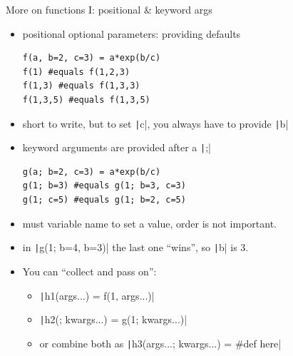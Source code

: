 \documentclass[aspectratio=169, 12pt]{beamer}
\begin{document}
    \begin{frame}[fragile]{More on functions I: positional \& keyword args}
        \begin{itemize}
            \item \alert{positional optional} parameters: providing defaults
        \begin{verbatim}
f(a, b=2, c=3) = a*exp(b/c)
f(1) #equals f(1,2,3)
f(1,3) #equals f(1,3,3)
f(1,3,5) #equals f(1,3,5)
        \end{verbatim}
        \item short to write, \alert{but} to set \texttt|c|, you always have to provide \texttt|b|
            \pause
            \item \alert{keyword arguments} are provided after a \texttt|;|
        \begin{verbatim}
g(a; b=2, c=3) = a*exp(b/c)
g(1; b=3) #equals g(1; b=3, c=3)
g(1; c=5) #equals g(1; b=2, c=5)
        \end{verbatim}
            \item must variable name to set a value, order is \alert{not} important.
            \pause
            \item in \texttt|g(1; b=4, b=3)| the last one “wins”, so \texttt|b| is 3.
            \pause
        \item You can “collect and pass on”:
            \begin{itemize}
                \item \texttt|h1(args...) = f(1, args...)|
                \item \texttt|h2(; kwargs...) = g(1; kwargs...)|
                \item or combine both as \texttt|h3(args...; kwargs...) = #def here|
            \end{itemize}
        \end{itemize}
    \end{frame}
\end{document}
